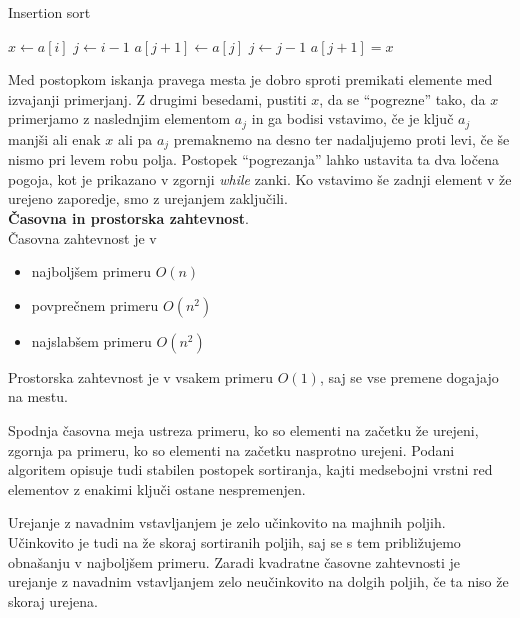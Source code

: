 \documentclass[a4paper,oneside]{article}
\begin{document}
\begin{algorithm}
  \caption{Insertion sort}\label{algo:insertionsort}
  \begin{algorithmic}[1]
            \State $x \gets a[i]$
            \State $j \gets i - 1$
                \State $a[j+1] \gets a[j]$
                \State $j \gets j - 1$
            \EndWhile
            \State $a[j+1] = x$
        \EndFor
    \EndFunction
  \end{algorithmic}
\end{algorithm}

Med postopkom iskanja pravega mesta je dobro sproti premikati elemente med izvajanji
primerjanj. Z drugimi besedami, pustiti $x$, da se ``pogrezne'' tako, da $x$
primerjamo z naslednjim elementom $a_j$ in ga bodisi vstavimo, če je ključ $a_j$ manjši
ali enak $x$ ali pa $a_j$ premaknemo na desno ter nadaljujemo proti levi, če še nismo pri
levem robu polja. Postopek ``pogrezanja'' lahko ustavita ta dva ločena
pogoja, kot je prikazano v zgornji \emph{while} zanki.  Ko vstavimo še zadnji element v že 
urejeno zaporedje, smo z urejanjem zaključili.\\

\textbf{Časovna in prostorska zahtevnost}. \\
Časovna zahtevnost je v 
\begin{itemize}
  \item najboljšem primeru $O(n)$
  \item povprečnem primeru $O(n^2)$
  \item najslabšem primeru $O(n^2)$
\end{itemize}

Prostorska zahtevnost je v vsakem primeru $O(1)$, saj se vse premene dogajajo na
mestu.\newline

Spodnja časovna meja ustreza primeru, ko so elementi na začetku že urejeni, zgornja pa primeru,
ko so elementi na začetku nasprotno urejeni. Podani algoritem opisuje tudi stabilen postopek sortiranja, kajti medsebojni
vrstni red elementov z enakimi ključi ostane nespremenjen.

Urejanje z navadnim vstavljanjem je zelo učinkovito na majhnih poljih. Učinkovito je tudi na že
skoraj sortiranih poljih, saj se s tem približujemo obnašanju v najboljšem primeru.
Zaradi kvadratne časovne zahtevnosti je urejanje z navadnim vstavljanjem zelo neučinkovito na
dolgih poljih, če ta niso že skoraj urejena.
\end{document}
